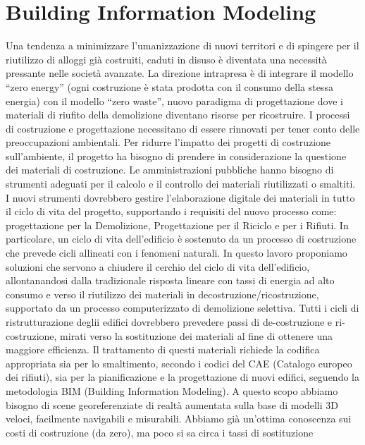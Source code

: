 \section{Building Information Modeling}
\label{sec:chapter_1_section_1}
\noindent

Una tendenza a minimizzare l'umanizzazione di nuovi territori e di spingere per il riutilizzo di alloggi
già costruiti, caduti in disuso è diventata una necessità pressante nelle società avanzate.
La direzione intrapresa è di integrare il modello ``zero energy'' (ogni costruzione è stata prodotta con il
consumo della stessa energia) con il modello ``zero waste'', nuovo paradigma di progettazione dove i materiali di
riufito della demolizione diventano risorse per ricostruire\cite{altamura:12}.
I processi di costruzione e progettazione necessitano di essere rinnovati per tener conto delle preoccupazioni
ambientali. Per ridurre l'impatto dei progetti di costruzione sull'ambiente, il progetto ha bisogno di prendere in
considerazione la questione dei materiali di costruzione.
Le amministrazioni pubbliche hanno bisogno di strumenti adeguati per il calcolo e il controllo dei materiali
riutilizzati o smaltiti.
I nuovi strumenti dovrebbero gestire l'elaborazione digitale dei materiali in tutto il ciclo di vita del progetto,
supportando i requisiti del nuovo processo come: progettazione per la Demolizione, Progettazione per il Riciclo e per i Rifiuti.
In particolare, un ciclo di vita dell'edificio è sostenuto da un processo di costruzione che prevede cicli allineati
con i fenomeni naturali.
In questo lavoro proponiamo soluzioni che servono a chiudere il cerchio del ciclo di vita dell'edificio, allontanandosi
dalla tradizionale risposta lineare con tassi di energia ad alto consumo e verso il riutilizzo
dei materiali in decostruzione/ricostruzione, supportato da un processo computerizzato di demolizione selettiva.
Tutti i cicli di ristrutturazione deglii edifici dovrebbero prevedere passi di de-costruzione e ri-costruzione, mirati
verso la sostituzione dei materiali al fine di ottenere una maggiore efficienza. Il trattamento di questi materiali
richiede la codifica appropriata sia per lo smaltimento, secondo i codici del CAE (Catalogo europeo dei rifiuti),
sia per la pianificazione e la progettazione di nuovi edifici, seguendo la metodologia BIM (Building Information Modeling).
A questo scopo abbiamo bisogno di scene georeferenziate di realtà aumentata sulla base di modelli 3D veloci,
facilmente navigabili e misurabili.
Abbiamo già un'ottima conoscenza sui costi di costruzione (da zero), ma poco si sa circa i tassi di sostituzione
